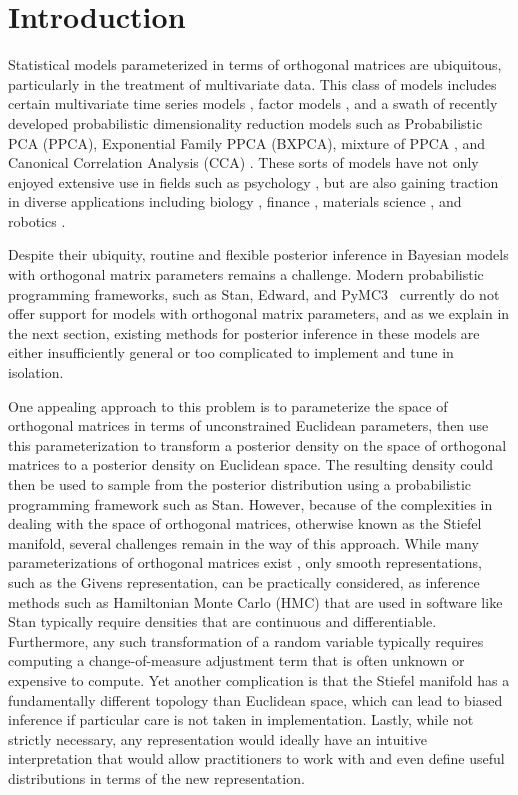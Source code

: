 \documentclass[ba]{imsart}
\numberwithin{equation}{section}
\theoremstyle{plain}
\begin{document}
\section{Introduction}
Statistical models parameterized in terms of orthogonal matrices are ubiquitous, particularly in the treatment of multivariate data. This class of models includes certain multivariate time series models \citep{brockwell2002introduction}, factor models \citep{johnson2004multivariate}, and a swath of recently developed probabilistic dimensionality reduction models such as Probabilistic PCA (PPCA),  Exponential Family PPCA (BXPCA), mixture of PPCA \citep{ghahramani1996algorithm}, and Canonical Correlation Analysis (CCA) \citep[Chapt.~12.5]{murphy2012machine}. These sorts of models have not only enjoyed extensive use in fields such as psychology \citep{ford1986application}, but are also gaining traction in diverse applications including biology \citep{hamelryck2006sampling}, finance \citep{lee2007bayesian}, materials science \citep{oh20172d}, and robotics \citep{lu1997robot}.

\noindent Despite their ubiquity, routine and flexible posterior inference in Bayesian models with orthogonal matrix parameters remains a challenge. Modern probabilistic programming frameworks, such as Stan, Edward, and PyMC3~\citep{carpenter2016stan,tran2016edward,salvatier2016probabilistic} currently do not offer support for models with orthogonal matrix parameters, and as we explain in the next section, existing methods for posterior inference in these models are either insufficiently general or too complicated to implement and tune in isolation.

\noindent One appealing approach to this problem is to parameterize the space of orthogonal matrices in terms of unconstrained Euclidean parameters, then use this parameterization to transform a posterior density on the space of orthogonal matrices to a posterior density on Euclidean space. The resulting density could then be used to sample from the posterior distribution using a probabilistic programming framework such as Stan. However, because of the complexities in dealing with the space of orthogonal matrices, otherwise known as the Stiefel manifold, several challenges remain in the way of this approach. While many parameterizations of orthogonal matrices exist \citep{anderson1987generation, shepard2015representation}, only smooth representations, such as the Givens representation, can be practically considered, as inference methods such as Hamiltonian Monte Carlo (HMC) that are used in software like Stan typically require densities that are continuous and differentiable. Furthermore, any such transformation of a random variable typically requires computing a change-of-measure adjustment term that is often unknown or expensive to compute. Yet another complication is that the Stiefel manifold has a fundamentally different topology than Euclidean space, which can lead to biased inference if particular care is not taken in implementation. Lastly, while not strictly necessary, any representation would ideally have an intuitive interpretation that would allow practitioners to work with and even define useful distributions in terms of the new representation.
\end{document}
